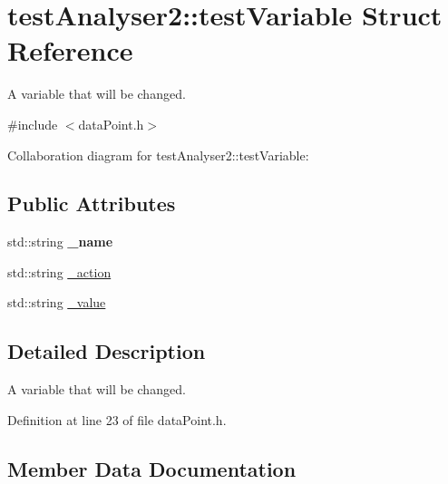 \hypertarget{structtestAnalyser2_1_1testVariable}{}\section{test\+Analyser2\+::test\+Variable Struct Reference}
\label{structtestAnalyser2_1_1testVariable}


A variable that will be changed.  




{\ttfamily \#include $<$data\+Point.\+h$>$}



Collaboration diagram for test\+Analyser2\+::test\+Variable\+:
\subsection*{Public Attributes}
\begin{DoxyCompactItemize}
\item 
\mbox{\label{structtestAnalyser2_1_1testVariable_a6ff727e354223ee44b121a1a8e4190da}} 
std\+::string {\bfseries \+\_\+name}
\item 
std\+::string \mbox{\hyperlink{structtestAnalyser2_1_1testVariable_ac93baba5652e93b7befb5ed3f608ec24}{\+\_\+action}}
\item 
std\+::string \mbox{\hyperlink{structtestAnalyser2_1_1testVariable_a667d6de717935ab634fde80d20279eda}{\+\_\+value}}
\end{DoxyCompactItemize}


\subsection{Detailed Description}
A variable that will be changed. 

Definition at line 23 of file data\+Point.\+h.



\subsection{Member Data Documentation}
\mbox{\label{structtestAnalyser2_1_1testVariable_ac93baba5652e93b7befb5ed3f608ec24}} 
